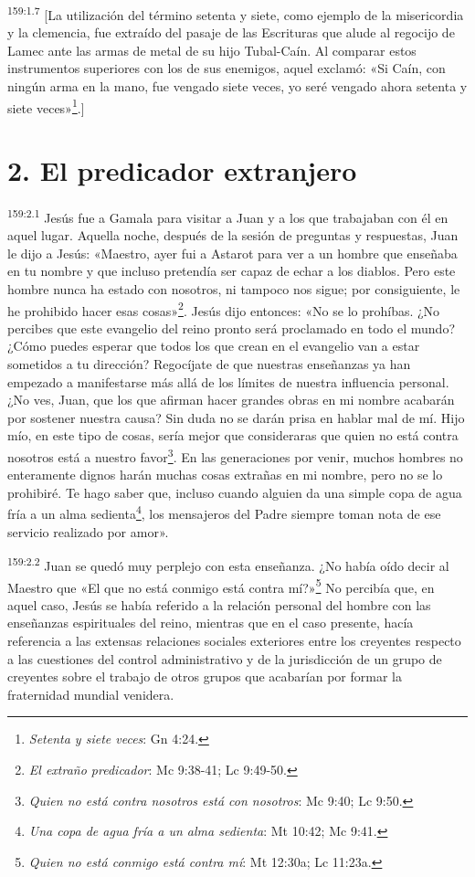 \par 
\textsuperscript{159:1.7} [La utilización del término setenta y siete, como ejemplo de la misericordia y la clemencia, fue extraído del pasaje de las Escrituras que alude al regocijo de Lamec ante las armas de metal de su hijo Tubal-Caín. Al comparar estos instrumentos superiores con los de sus enemigos, aquel exclamó: «Si Caín, con ningún arma en la mano, fue vengado siete veces, yo seré vengado ahora setenta y siete veces»\footnote{\textit{Setenta y siete veces}: Gn 4:24.}.]

\section*{2. El predicador extranjero}
\par 
\textsuperscript{159:2.1} Jesús fue a Gamala para visitar a Juan y a los que trabajaban con él en aquel lugar. Aquella noche, después de la sesión de preguntas y respuestas, Juan le dijo a Jesús: «Maestro, ayer fui a Astarot para ver a un hombre que enseñaba en tu nombre y que incluso pretendía ser capaz de echar a los diablos. Pero este hombre nunca ha estado con nosotros, ni tampoco nos sigue; por consiguiente, le he prohibido hacer esas cosas»\footnote{\textit{El extraño predicador}: Mc 9:38-41; Lc 9:49-50.}. Jesús dijo entonces: «No se lo prohíbas. ¿No percibes que este evangelio del reino pronto será proclamado en todo el mundo? ¿Cómo puedes esperar que todos los que crean en el evangelio van a estar sometidos a tu dirección? Regocíjate de que nuestras enseñanzas ya han empezado a manifestarse más allá de los límites de nuestra influencia personal. ¿No ves, Juan, que los que afirman hacer grandes obras en mi nombre acabarán por sostener nuestra causa? Sin duda no se darán prisa en hablar mal de mí. Hijo mío, en este tipo de cosas, sería mejor que consideraras que quien no está contra nosotros está a nuestro favor\footnote{\textit{Quien no está contra nosotros está con nosotros}: Mc 9:40; Lc 9:50.}. En las generaciones por venir, muchos hombres no enteramente dignos harán muchas cosas extrañas en mi nombre, pero no se lo prohibiré. Te hago saber que, incluso cuando alguien da una simple copa de agua fría a un alma sedienta\footnote{\textit{Una copa de agua fría a un alma sedienta}: Mt 10:42; Mc 9:41.}, los mensajeros del Padre siempre toman nota de ese servicio realizado por amor».

\par 
\textsuperscript{159:2.2} Juan se quedó muy perplejo con esta enseñanza. ¿No había oído decir al Maestro que «El que no está conmigo está contra mí?»\footnote{\textit{Quien no está conmigo está contra mí}: Mt 12:30a; Lc 11:23a.} No percibía que, en aquel caso, Jesús se había referido a la relación personal del hombre con las enseñanzas espirituales del reino, mientras que en el caso presente, hacía referencia a las extensas relaciones sociales exteriores entre los creyentes respecto a las cuestiones del control administrativo y de la jurisdicción de un grupo de creyentes sobre el trabajo de otros grupos que acabarían por formar la fraternidad mundial venidera.

